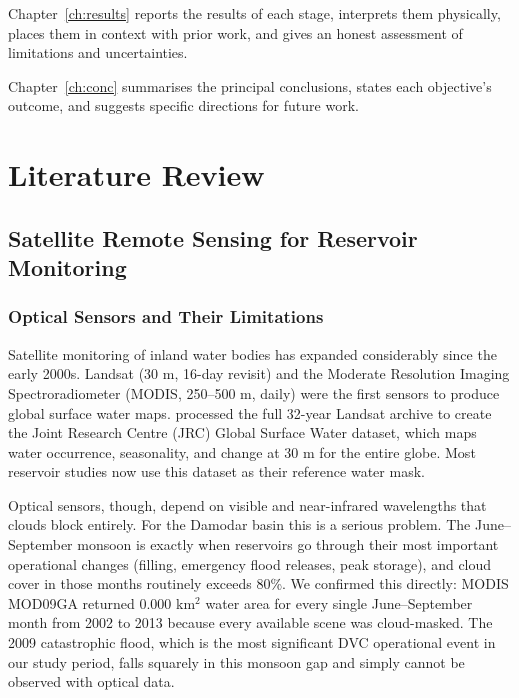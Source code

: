 \documentclass[12pt,a4paper,oneside]{report}
\begin{document}
Chapter~\ref{ch:results} reports the results of each stage, interprets them
physically, places them in context with prior work, and gives an honest
assessment of limitations and uncertainties.

Chapter~\ref{ch:conc} summarises the principal conclusions, states each
objective's outcome, and suggests specific directions for future work.


\chapter{Literature Review}
\label{ch:lit}

\section{Satellite Remote Sensing for Reservoir Monitoring}

\subsection{Optical Sensors and Their Limitations}

Satellite monitoring of inland water bodies has expanded considerably since
the early 2000s. Landsat (30 m, 16-day revisit) and the Moderate Resolution
Imaging Spectroradiometer (MODIS, 250--500 m, daily) were the first sensors
to produce global surface water maps. \citet{Pekel2016} processed the full
32-year Landsat archive to create the Joint Research Centre (JRC) Global
Surface Water dataset, which maps water occurrence, seasonality, and change
at 30 m for the entire globe. Most reservoir studies now use this dataset as
their reference water mask.

Optical sensors, though, depend on visible and near-infrared wavelengths
that clouds block entirely. For the Damodar basin this is a serious problem.
The June--September monsoon is exactly when reservoirs go through their most
important operational changes (filling, emergency flood releases, peak
storage), and cloud cover in those months routinely exceeds 80\%. We
confirmed this directly: MODIS MOD09GA returned $0.000$ km$^2$ water area
for every single June--September month from 2002 to 2013 because every
available scene was cloud-masked. The 2009 catastrophic flood, which is the
most significant DVC operational event in our study period, falls squarely
in this monsoon gap and simply cannot be observed with optical data.
\end{document}
